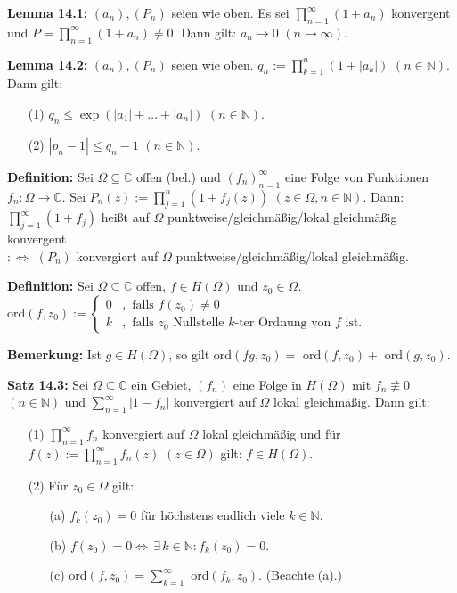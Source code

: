 \documentclass[11pt]{article}
\newcommand{\C}{\mathbb{C}}
\newcommand{\N}{\mathbb{N}}
\begin{document}
\textbf{Lemma 14.1:} $(a_n), (P_n)$ seien wie oben. Es sei $\prod_{n = 1}^\infty (1 + a_n)$ konvergent und $P = \prod_{n = 1}^\infty (1 + a_n) \neq 0$. Dann gilt: $a_n \to 0$ $(n \to \infty)$.

\textbf{Lemma 14.2:} $(a_n), (P_n)$ seien wie oben. $q_n := \prod_{k = 1}^n (1 + |a_k|)$ $(n \in \N)$. Dann gilt:
\vspace{-0.6cm}
\begin{itemize}
\item[(1)] $q_n \leq \exp(|a_1| + \dots + |a_n|)$ $(n \in \N)$. \vspace{-0.2cm}
\item[(2)] $|p_n - 1| \leq q_n - 1$ $(n \in \N)$.
\end{itemize} 
\vspace{-0.3cm}

\textbf{Definition:} Sei $\Omega \subseteq \C$ offen (bel.) und $(f_n)_{n=1}^\infty$ eine Folge von Funktionen $f_n \colon \Omega \to \C$. Sei $P_n(z) := \prod_{j=1}^n (1 + f_j(z))$ $(z \in \Omega, n \in \N)$. Dann: \\
$\prod_{j=1}^\infty (1 + f_j)$ heißt auf $\Omega$ punktweise/gleichmäßig/lokal gleichmäßig konvergent \\
$:\Leftrightarrow$ $(P_n)$ konvergiert auf $\Omega$ punktweise/gleichmäßig/lokal gleichmäßig.

\textbf{Definition:} Sei $\Omega \subseteq \C$ offen, $f \in H(\Omega)$ und $z_0 \in \Omega$. \\
ord$(f,z_0) :=
  \begin{cases} 
0 &, \text{ falls } f(z_0) \neq 0 \\ 
k &, \text{ falls } z_0 \text{ Nullstelle } k\text{-ter Ordnung von } f \text{ ist.}
\end{cases}
$

\textbf{Bemerkung:} Ist $g \in H(\Omega)$, so gilt ord$(fg, z_0) = $ ord$(f, z_0) + $ ord$(g, z_0)$.

\textbf{Satz 14.3:} Sei $\Omega \subseteq \C$ ein Gebiet, $(f_n)$ eine Folge in $H(\Omega)$ mit $f_n \not\equiv 0$ $(n \in \N)$ und $\sum_{n=1}^\infty |1-f_n|$ konvergiert auf $\Omega$ lokal gleichmäßig. Dann gilt:
\vspace{-0.6cm}
\begin{itemize}
\item[(1)] $\prod_{n=1}^\infty f_n$ konvergiert auf $\Omega$ lokal gleichmäßig und für $f(z) := \prod_{n=1}^\infty f_n(z)$ $(z \in \Omega)$ gilt: $f \in H(\Omega)$. \vspace{-0.2cm}
\item[(2)] Für $z_0 \in \Omega$ gilt:
\vspace{-0.2cm}
\begin{itemize}
\item[(a)] $f_k(z_0) = 0$ für höchstens endlich viele $k \in \N$.
\item[(b)] $f(z_0) = 0 \Leftrightarrow \, \exists \, k \in \N \colon f_k(z_0) = 0$.
\item[(c)] ord$(f,z_0) = \sum_{k=1}^\infty$ ord$(f_k, z_0)$. (Beachte (a).)
\end{itemize}
\end{itemize}
\vspace{-0.3cm}
\end{document}
